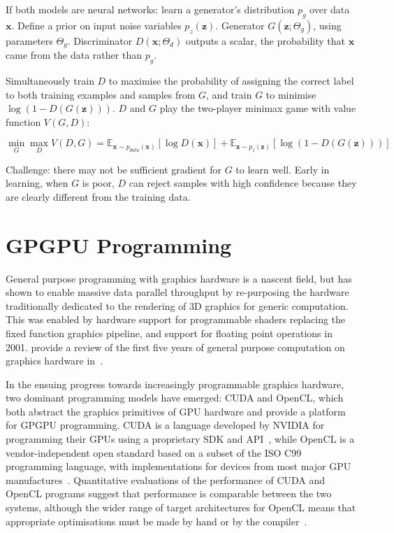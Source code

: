 If both models are neural networks: learn a generator's distribution $p_g$ over data $\bm{x}$. Define a prior on input noise variables $p_z(\bm{z})$. Generator $G(\bm{z}; \Theta_g)$, using parameters $\Theta_g$. Discriminator $D(\bm{x}; \Theta_d)$ outputs a scalar, the probability that $\bm{x}$ came from the data rather than $p_g$. 

Simultaneously train $D$ to maximise the probability of assigning the correct label to both training examples and samples from $G$, and train $G$ to minimise $\log (1 - D(G(\bm{z})))$. $D$ and $G$ play the two-player minimax game with value function $V(G, D)$:

\[ \min_G \max_D V(D, G) = \mathbb{E}_{\bm{x} \sim  p_{data}(\bm{x})} [ \log D(\bm{x}) ] + \mathbb{E}_{\bm{z} \sim p_z(\bm{z})} [ \log (1 - D(G(\bm{z}))) ] \]

Challenge: there may not be sufficient gradient for $G$ to learn well. Early in learning, when $G$ is poor, $D$ can reject samples with high confidence because they are clearly different from the training data.


\section{GPGPU Programming}
\label{subsec:background-gpgpu}

General purpose programming with graphics hardware is a nascent field, but has shown to enable massive data parallel throughput by re-purposing the hardware traditionally dedicated to the rendering of 3D graphics for generic computation. This was enabled by hardware support for programmable shaders replacing the fixed function graphics pipeline, and support for floating point operations in 2001. \citeauthor{Owens2006} provide a review of the first five years of general purpose computation on graphics hardware in~\cite{Owens2006}.

In the ensuing progress towards increasingly programmable graphics hardware, two dominant programming models have emerged: CUDA and OpenCL, which both abstract the graphics primitives of GPU hardware and provide a platform for GPGPU programming. CUDA is a language developed by NVIDIA for programming their GPUs using a proprietary SDK and API~\cite{Nvidia2007}, while OpenCL is a vendor-independent open standard based on a subset of the ISO C99 programming language, with implementations for devices from most major GPU manufactures~\cite{Stone2010}. Quantitative evaluations of the performance of CUDA and OpenCL programs suggest that performance is comparable between the two systems, although the wider range of target architectures for OpenCL means that appropriate optimisations must be made by hand or by the compiler~\cite{Komatsu2010,Karimi2010}.


